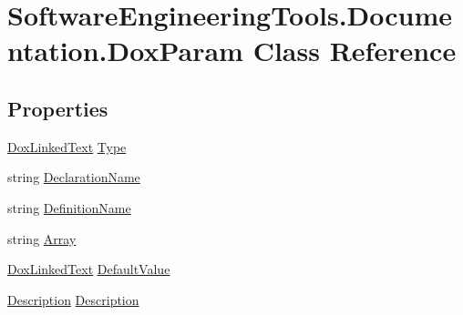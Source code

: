 \hypertarget{class_software_engineering_tools_1_1_documentation_1_1_dox_param}{\section{Software\+Engineering\+Tools.\+Documentation.\+Dox\+Param Class Reference}
\label{class_software_engineering_tools_1_1_documentation_1_1_dox_param}
}
\subsection*{Properties}
\begin{DoxyCompactItemize}
\item 
\hyperlink{class_software_engineering_tools_1_1_documentation_1_1_dox_linked_text}{Dox\+Linked\+Text} \hyperlink{class_software_engineering_tools_1_1_documentation_1_1_dox_param_ac303701ced7c1c167212c7e7a9724781}{Type}
\item 
string \hyperlink{class_software_engineering_tools_1_1_documentation_1_1_dox_param_aa4851129748220e1e62634c7b9468621}{Declaration\+Name}
\item 
string \hyperlink{class_software_engineering_tools_1_1_documentation_1_1_dox_param_a0bec35602586da4466d2ab77dfd2d8d1}{Definition\+Name}
\item 
string \hyperlink{class_software_engineering_tools_1_1_documentation_1_1_dox_param_a50b5bfe18375627cba43878c9de316d1}{Array}
\item 
\hyperlink{class_software_engineering_tools_1_1_documentation_1_1_dox_linked_text}{Dox\+Linked\+Text} \hyperlink{class_software_engineering_tools_1_1_documentation_1_1_dox_param_a210dc9de3e4f38ef87f9b077ec939045}{Default\+Value}
\item 
\hyperlink{class_software_engineering_tools_1_1_documentation_1_1_description}{Description} \hyperlink{class_software_engineering_tools_1_1_documentation_1_1_dox_param_ac8d46b158c50fa461fde98360c9546eb}{Description}
\end{DoxyCompactItemize}


